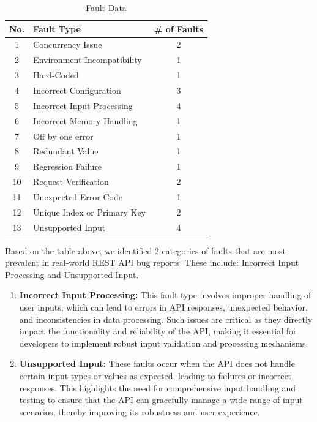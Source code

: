 \documentclass[conference]{IEEEtran}
\begin{document}
\begin{table}[ht]
    \centering
    \caption{Fault Data}
    \label{tab:faultData}
    \begin{tabular}{|c|p{6cm}|c|}
    \hline
        \hline
        \textbf{No.} & \textbf{Fault Type} & \textbf{\# of Faults} \\ \hline
        1 & Concurrency Issue & 2 \\ \hline
        2 & Environment Incompatibility &  1 \\ \hline
        3 & Hard-Coded & 1 \\ \hline
        4 & Incorrect Configuration & 3 \\ \hline
        5 & Incorrect Input Processing & 4 \\ \hline
        6 & Incorrect Memory Handling & 1 \\ \hline
        7 & Off by one error & 1 \\ \hline
        8 & Redundant Value & 1 \\ \hline 
        9 & Regression Failure & 1 \\ \hline 
        10 & Request Verification & 2 \\ \hline
        11 & Unexpected Error Code & 1 \\ \hline
        12 & Unique Index or Primary Key & 2 \\ \hline
        13 & Unsupported Input & 4 \\ \hline
    \end{tabular}
\end{table}
 

Based on the table above, we identified 2 categories of faults that are most prevalent in real-world REST API bug reports. These include: Incorrect Input Processing and Unsupported Input.


\begin{enumerate}
    \item \textbf{Incorrect Input Processing:} This fault type involves improper handling of user inputs, which can lead to errors in API responses, unexpected behavior, and inconsistencies in data processing. Such issues are critical as they directly impact the functionality and reliability of the API, making it essential for developers to implement robust input validation and processing mechanisms.
    \item \textbf{Unsupported Input:}  These faults occur when the API does not handle certain input types or values as expected, leading to failures or incorrect responses. This highlights the need for comprehensive input handling and testing to ensure that the API can gracefully manage a wide range of input scenarios, thereby improving its robustness and user experience.
\end{enumerate}
\end{document}
